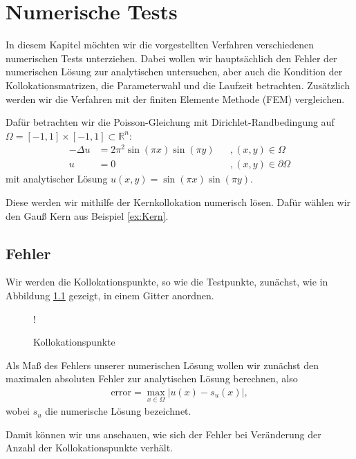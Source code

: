 \chapter{Numerische Tests}
\label{cha:NumerischeTests}

In diesem Kapitel möchten wir die vorgestellten Verfahren verschiedenen numerischen Tests unterziehen. Dabei wollen wir hauptsächlich den Fehler der numerischen Lösung zur analytischen untersuchen, aber auch die Kondition der Kollokationsmatrizen, die Parameterwahl und die Laufzeit betrachten. Zusätzlich werden wir die Verfahren mit der finiten Elemente Methode (\acs{FEM}) vergleichen.

Dafür betrachten wir die Poisson-Gleichung mit Dirichlet-Randbedingung auf $\Omega = [-1,1] \times [-1,1] \subset \mathbb{R}^n$:
\begin{align*}
- \Delta u &= 2\pi^2 \sin(\pi x)\sin(\pi y)&&, (x,y) \in \Omega\\
u &= 0&&, (x,y) \in \partial \Omega
\end{align*}
mit analytischer Lösung $u(x,y) = \sin(\pi x)\sin(\pi y)$.

Diese werden wir mithilfe der Kernkollokation numerisch lösen. Dafür wählen wir den Gauß Kern aus Beispiel \ref{ex:Kern}.

\section{Fehler}
Wir werden die Kollokationspunkte, so wie die Testpunkte, zunächst, wie in Abbildung \ref{fig:Kollok} gezeigt, in einem Gitter anordnen.
\begin{figure}[h]
\centering
\resizebox {.8\columnwidth} {!} {

}
\caption{Kollokationspunkte}
\label{fig:Kollok}
\end{figure}
Als Maß des Fehlers unserer numerischen Lösung wollen wir zunächst den maximalen absoluten Fehler zur analytischen Lösung berechnen, also
\begin{align*}
\text{error} = \max_{x \in \Omega} |u(x) - s_u (x)|,
\end{align*}
wobei $s_u$ die numerische Lösung bezeichnet.

Damit können wir uns anschauen, wie sich der Fehler bei Veränderung der Anzahl der Kollokationspunkte verhält.

